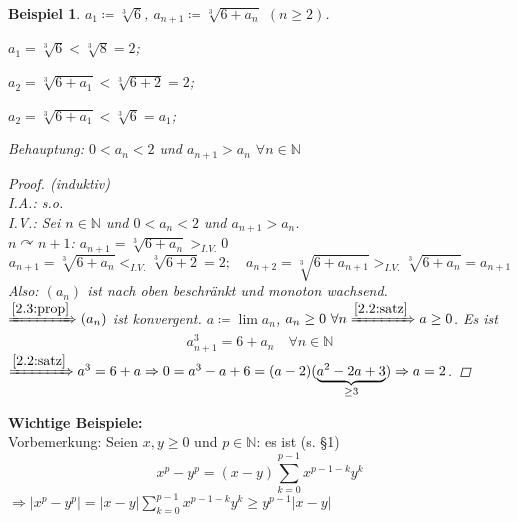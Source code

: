 \documentclass{extreport}
\newcommand{\N}{\mathbb{N}}
\theoremstyle{named}
\theoremstyle{dotless}
\newtheorem*{beispiel*}{Beispiel}
\begin{document}
\begin{beispiel*} $a_{1} \coloneqq \sqrt[3]{6}$, $a_{n + 1} \coloneqq \sqrt[3]{6 + a_{n}}$ $(n \geq 2)$.
	\begin{description}
		\item $a_{1} = \sqrt[3]{6} < \sqrt[3]{8} = 2$;
		\item $a_{2} = \sqrt[3]{6 + a_{1}} < \sqrt[3]{6 + 2} = 2$;
		\item $a_{2} = \sqrt[3]{6 + a_{1}} < \sqrt[3]{6} = a_{1}$;
	\end{description}
	Behauptung: $0 < a_{n} < 2$ und $a_{n + 1} > a_{n}$ $\forall n \in \N$

	\begin{proof}(induktiv) \\
		I.A.: s.o. \\
		I.V.: Sei $n \in \N$ und $0 < a_{n} < 2$ und $a_{n+1} > a_{n}$. \\
		$n \curvearrowright n + 1$: $a_{n + 1} = \sqrt[3]{6 + a_{n}} >_{I.V.} 0$
		$$
			a_{n +1} = \sqrt[3]{6 + a_{n}} <_{I.V.} \sqrt[3]{6 + 2} = 2; \quad a_{n + 2} = \sqrt[3]{6 + a_{n+1}} >_{I.V.} \sqrt[3]{6 + a_{n}} = a_{n + 1}
		$$
		Also: $(a_{n})$ ist nach oben beschränkt und monoton wachsend. \\
		$\xRightarrow[]{\ref{2.3:prop}} (a_{n})$ ist konvergent. $a \coloneqq \lim a_{n}$, $a_{n} \geq 0 ~\forall n \xRightarrow[]{\ref{2.2:satz}} a \geq 0$. Es ist
		$$
			a_{n+1}^{3} = 6 + a_{n} \quad \forall n \in \N
		$$
		$\xRightarrow[]{\ref{2.2:satz}} a^{3} = 6 + a \Rightarrow 0 = a^{3} - a + 6 = (a-2)(\underbrace{a^{2}-2a+3}_{\geq 3}) \Rightarrow a = 2$.
	\end{proof}
\end{beispiel*}


\textbf{Wichtige Beispiele:} \\

Vorbemerkung: Seien $x, y \geq 0$ und $p \in \N$: es ist (s. \S 1)
$$
	x^{p} - y^{p} = (x - y) \sum_{k = 0}^{p-1} x^{p-1-k}y^{k}
$$
$\Rightarrow |x^{p} - y^{p}| = |x-y| \sum_{k=0}^{p-1} x^{p-1-k}y^{k} \geq y^{p-1} |x - y|$
\newline
\end{document}
